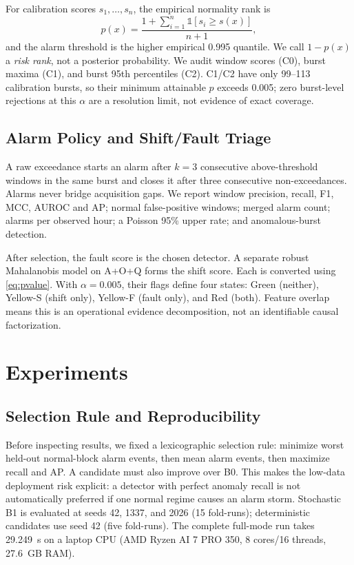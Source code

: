 \documentclass{article}
\begin{document}
For calibration scores $s_1,\ldots,s_n$, the empirical normality rank is
\begin{equation}
p(x)=\frac{1+\sum_{i=1}^{n}\mathbb{1}[s_i\geq s(x)]}{n+1},
\label{eq:pvalue}
\end{equation}
and the alarm threshold is the higher empirical 0.995 quantile. We call $1-p(x)$ a \emph{risk rank}, not a posterior probability. We audit window scores (C0), burst maxima (C1), and burst 95th percentiles (C2). C1/C2 have only 99--113 calibration bursts, so their minimum attainable $p$ exceeds 0.005; zero burst-level rejections at this $\alpha$ are a resolution limit, not evidence of exact coverage.

\subsection{Alarm Policy and Shift/Fault Triage}

A raw exceedance starts an alarm after $k=3$ consecutive above-threshold windows in the same burst and closes it after three consecutive non-exceedances. Alarms never bridge acquisition gaps. We report window precision, recall, F1, MCC, AUROC and AP; normal false-positive windows; merged alarm count; alarms per observed hour; a Poisson 95\% upper rate; and anomalous-burst detection.

After selection, the fault score is the chosen detector. A separate robust Mahalanobis model on A+O+Q forms the shift score. Each is converted using \cref{eq:pvalue}. With $\alpha=0.005$, their flags define four states: Green (neither), Yellow-S (shift only), Yellow-F (fault only), and Red (both). Feature overlap means this is an operational evidence decomposition, not an identifiable causal factorization.

\section{Experiments}

\subsection{Selection Rule and Reproducibility}

Before inspecting results, we fixed a lexicographic selection rule: minimize worst held-out normal-block alarm events, then mean alarm events, then maximize recall and AP. A candidate must also improve over B0. This makes the low-data deployment risk explicit: a detector with perfect anomaly recall is not automatically preferred if one normal regime causes an alarm storm. Stochastic B1 is evaluated at seeds 42, 1337, and 2026 (15 fold-runs); deterministic candidates use seed 42 (five fold-runs). The complete full-mode run takes 29.249~s on a laptop CPU (AMD Ryzen AI 7 PRO 350, 8 cores/16 threads, 27.6~GB RAM).
\end{document}
